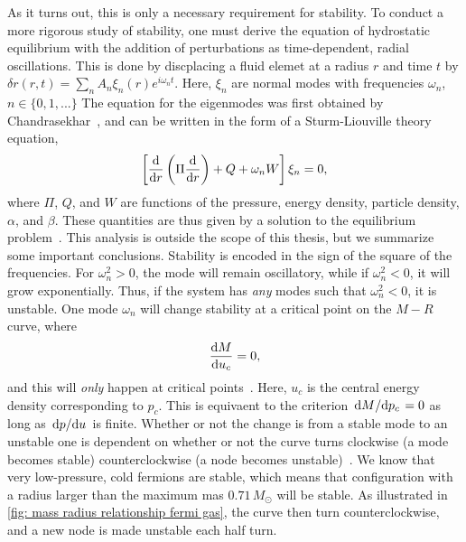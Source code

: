 As it turns out, this is only a necessary requirement for stability.
To conduct a more rigorous study of stability, one must derive the equation of hydrostatic equilibrium with the addition of perturbations as time-dependent, radial oscillations.
This is done by discplacing a fluid elemet at a radius $r$ and time $t$ by $\delta r(r, t) = \sum_n A_n \xi_n(r) e^{i \omega_n t}$.
Here, $\xi_n$ are normal modes with frequencies $\omega_n$, $n \in \{0, 1, ...\}$
The equation for the eigenmodes was first obtained by Chandrasekhar~\autocite{chandrasekharDynamicalInstabilityGaseous1964}, and can be written in the form of a Sturm-Liouville theory equation,
%
\begin{equation}
    \left[     \odv{}{r} \left( \Pi \odv{}{r}  \right) + Q + \omega_n W \right] \xi_n
    = 0,
\end{equation}
%
where $\Pi$, $Q$, and $W$ are functions of the pressure, energy density, particle density, $\alpha$, and $\beta$.
These quantities are thus given by a solution to the equilibrium problem~\cite{glendenningCompactStarsNuclear2012}.
This analysis is outside the scope of this thesis, but we summarize some important conclusions.
Stability is encoded in the sign of the square of the frequencies.
For $\omega_n^2>0$, the mode will remain oscillatory, while if $\omega_n^2<0$, it will grow exponentially.
Thus, if the system has \emph{any} modes such that $\omega_n^2<0$, it is unstable.
One mode $\omega_n$ will change stability at a critical point on the $M-R$ curve, where
%
\begin{equation}
    \odv{M}{u_c} = 0,
\end{equation}
%
and this will \emph{only} happen at critical points~\autocite{thorneGENERALRELATIVISTICTHEORYSTELLAR1968a}. Here, $u_c$ is the central energy density corresponding to $p_c$.
This is equivaent to the criterion $\odv{M}/{p_c} = 0$ as long as $\odv{p}/{u}$ is finite.
Whether or not the change is from a stable mode to an unstable one is dependent on whether or not the curve turns clockwise (a mode becomes stable) counterclockwise (a node becomes unstable)~\autocite{thorneGENERALRELATIVISTICTHEORYSTELLAR1968a}.
We know that very low-pressure, cold fermions are stable, which means that configuration with a radius larger than the maximum mas $0.71 \, M_\odot$ will be stable.
As illustrated in \autoref{fig: mass radius relationship fermi gas}, the curve then turn counterclockwise, and a new node is made unstable each half turn.

